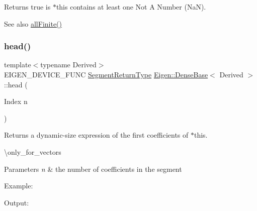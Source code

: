 \begin{DoxyReturn}{Returns}
true is {\ttfamily $\ast$this} contains at least one Not A Number (NaN).
\end{DoxyReturn}
\begin{DoxySeeAlso}{See also}
\mbox{\hyperlink{class_eigen_1_1_dense_base_af1e669fd3aaae50a4870dc1b8f3b8884}{all\+Finite()}} 
\end{DoxySeeAlso}
\mbox{\label{class_eigen_1_1_dense_base_ac05a64c0740a6935f9d5d2a3558737e9}} 
\subsubsection{\texorpdfstring{head()}{head()}\hspace{0.1cm}{\footnotesize\ttfamily [1/2]}}
{\footnotesize\ttfamily template$<$typename Derived$>$ \\
E\+I\+G\+E\+N\+\_\+\+D\+E\+V\+I\+C\+E\+\_\+\+F\+U\+NC \mbox{\hyperlink{class_eigen_1_1_vector_block}{Segment\+Return\+Type}} \mbox{\hyperlink{class_eigen_1_1_dense_base}{Eigen\+::\+Dense\+Base}}$<$ Derived $>$\+::head (\begin{DoxyParamCaption}\item[{Index}]{n }\end{DoxyParamCaption})\hspace{0.3cm}{\ttfamily [inline]}}

\begin{DoxyReturn}{Returns}
a dynamic-\/size expression of the first coefficients of $\ast$this.
\end{DoxyReturn}
\textbackslash{}only\+\_\+for\+\_\+vectors


\begin{DoxyParams}{Parameters}
{\em n} & the number of coefficients in the segment\\
\hline
\end{DoxyParams}
Example\+: 
\begin{DoxyCodeInclude}{0}
\end{DoxyCodeInclude}
 Output\+: 
\begin{DoxyVerbInclude}
\end{DoxyVerbInclude}


